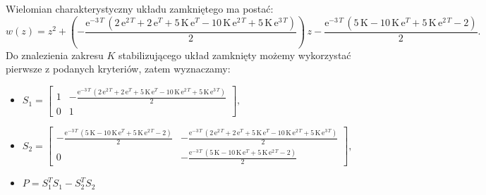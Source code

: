 \documentclass{article}
\begin{document}
    Wielomian charakterystyczny układu zamkniętego ma postać:
    $$
        w(z) = z^2+\left(-\frac{{\mathrm{e}}^{-3\,T}\,\left(2\,{\mathrm{e}}^{2\,T}+2\,{\mathrm{e}}^T+5\,\mathrm{K}\,{\mathrm{e}}^T-10\,\mathrm{K}\,{\mathrm{e}}^{2\,T}+5\,\mathrm{K}\,{\mathrm{e}}^{3\,T}\right)}{2}\right)\,z-\frac{{\mathrm{e}}^{-3\,T}\,\left(5\,\mathrm{K}-10\,\mathrm{K}\,{\mathrm{e}}^T+5\,\mathrm{K}\,{\mathrm{e}}^{2\,T}-2\right)}{2}.
    $$
    Do znalezienia zakresu $K$ stabilizującego układ zamknięty możemy wykorzystać pierwsze z podanych kryteriów, zatem wyznaczamy:
    \begin{itemize}
        \item $
        S_{1}
        =
        \left[\begin{array}{cc} 1 & -\frac{{\mathrm{e}}^{-3\,T}\,\left(2\,{\mathrm{e}}^{2\,T}+2\,{\mathrm{e}}^T+5\,\mathrm{K}\,{\mathrm{e}}^T-10\,\mathrm{K}\,{\mathrm{e}}^{2\,T}+5\,\mathrm{K}\,{\mathrm{e}}^{3\,T}\right)}{2}\\ 0 & 1 \end{array}\right],
        $
        \item $
        S_{2}
        =
        \left[\begin{array}{cc} -\frac{{\mathrm{e}}^{-3\,T}\,\left(5\,\mathrm{K}-10\,\mathrm{K}\,{\mathrm{e}}^T+5\,\mathrm{K}\,{\mathrm{e}}^{2\,T}-2\right)}{2} & -\frac{{\mathrm{e}}^{-3\,T}\,\left(2\,{\mathrm{e}}^{2\,T}+2\,{\mathrm{e}}^T+5\,\mathrm{K}\,{\mathrm{e}}^T-10\,\mathrm{K}\,{\mathrm{e}}^{2\,T}+5\,\mathrm{K}\,{\mathrm{e}}^{3\,T}\right)}{2}\\ 0 & -\frac{{\mathrm{e}}^{-3\,T}\,\left(5\,\mathrm{K}-10\,\mathrm{K}\,{\mathrm{e}}^T+5\,\mathrm{K}\,{\mathrm{e}}^{2\,T}-2\right)}{2} \end{array}\right],
        $
        \item $
        P = S_{1}^{T}S_{1} - S_{2}^{T}S_{2}
        $
    \end{itemize}
\end{document}
